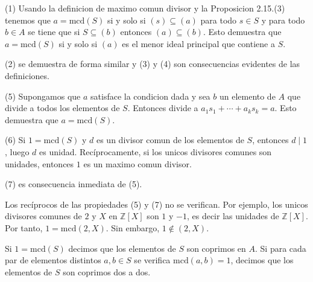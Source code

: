 \begin{proofbox}
(1) Usando la definicion de maximo comun divisor y la Proposicion 2.15.(3) tenemos que \(a = \mathrm{mcd}(S)\) si y solo si \((s) \subseteq (a)\) para todo \(s \in S\) y para todo \(b \in A\) se tiene que si \(S \subseteq (b)\) entonces \((a) \subseteq (b)\). Esto demuestra que \(a = \mathrm{mcd}(S)\) si y solo si \((a)\) es el menor ideal principal que contiene a \(S\).

(2) se demuestra de forma similar y (3) y (4) son consecuencias evidentes de las definiciones.

(5) Supongamos que \(a\) satisface la condicion dada y sea \(b\) un elemento de \(A\) que divide a todos los elementos de \(S\). Entonces divide a \(a_1 s_1 + \cdots + a_k s_k = a\). Esto demuestra que \(a = \mathrm{mcd}(S)\).

(6) Si \(1 = \mathrm{mcd}(S)\) y \(d\) es un divisor comun de los elementos de \(S\), entonces \(d \mid 1\), luego \(d\) es unidad. Recíprocamente, si los unicos divisores comunes son unidades, entonces \(1\) es un maximo comun divisor.

(7) es consecuencia inmediata de (5).
\end{proofbox}

\begin{example}{}{}
Los recíprocos de las propiedades (5) y (7) no se verifican. Por ejemplo, los unicos divisores comunes de \(2\) y \(X\) en \(\mathbb{Z}[X]\) son \(1\) y \(-1\), es decir las unidades de \(\mathbb{Z}[X]\). Por tanto, \(1 = \mathrm{mcd}(2,X)\). Sin embargo, \(1 \not\in (2,X)\).
\end{example}

Si \(1 = \mathrm{mcd}(S)\) decimos que los elementos de \(S\) son coprimos en \(A\). Si para cada par de elementos distintos \(a, b \in S\) se verifica \(\mathrm{mcd}(a,b) = 1\), decimos que los elementos de \(S\) son coprimos dos a dos.